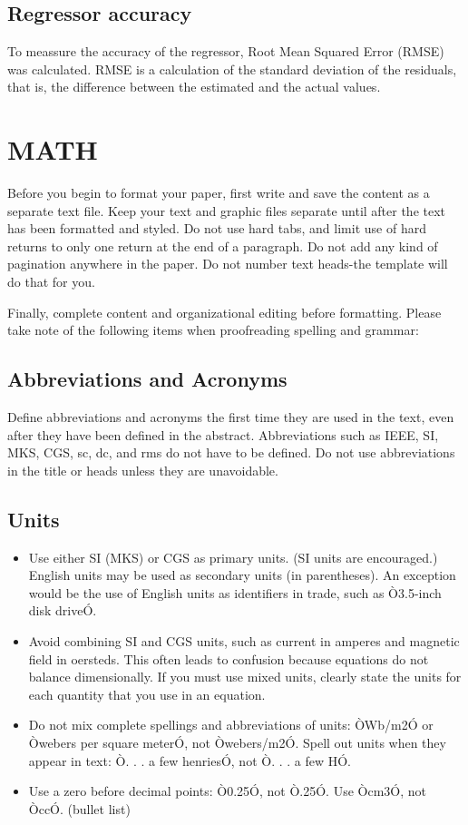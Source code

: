 \documentclass[a4paper, 10pt, conference]{ieeeconf}      %
\begin{document}
	\subsection{Regressor accuracy}
	To meassure the accuracy of the regressor, Root Mean Squared Error (RMSE) was calculated. RMSE is a calculation of the standard deviation of the residuals, that is, the difference between the estimated and the actual values.
	
	\section{MATH}
	
	Before you begin to format your paper, first write and save the content as a separate text file. Keep your text and graphic files separate until after the text has been formatted and styled. Do not use hard tabs, and limit use of hard returns to only one return at the end of a paragraph. Do not add any kind of pagination anywhere in the paper. Do not number text heads-the template will do that for you.
	
	Finally, complete content and organizational editing before formatting. Please take note of the following items when proofreading spelling and grammar:
	
	\subsection{Abbreviations and Acronyms} Define abbreviations and acronyms the first time they are used in the text, even after they have been defined in the abstract. Abbreviations such as IEEE, SI, MKS, CGS, sc, dc, and rms do not have to be defined. Do not use abbreviations in the title or heads unless they are unavoidable.
	
	\subsection{Units}
	
	\begin{itemize}
		
		\item Use either SI (MKS) or CGS as primary units. (SI units are encouraged.) English units may be used as secondary units (in parentheses). An exception would be the use of English units as identifiers in trade, such as Ò3.5-inch disk driveÓ.
		\item Avoid combining SI and CGS units, such as current in amperes and magnetic field in oersteds. This often leads to confusion because equations do not balance dimensionally. If you must use mixed units, clearly state the units for each quantity that you use in an equation.
		\item Do not mix complete spellings and abbreviations of units: ÒWb/m2Ó or Òwebers per square meterÓ, not Òwebers/m2Ó.  Spell out units when they appear in text: Ò. . . a few henriesÓ, not Ò. . . a few HÓ.
		\item Use a zero before decimal points: Ò0.25Ó, not Ò.25Ó. Use Òcm3Ó, not ÒccÓ. (bullet list)
		
	\end{itemize}
	
\end{document}
